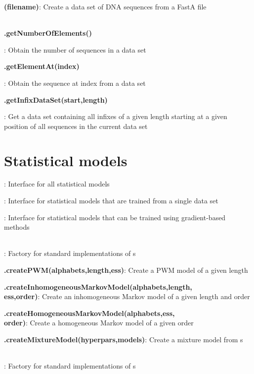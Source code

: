 \documentclass[10pt]{scrartcl}
\newcommand{\entry}[3]{{\item[]\bfseries #1#2}: #3}
\newcommand{\entrys}[3]{\item[\emph{static}] {\bfseries {#1#2}}: #3}
\newcommand{\entryn}[3]{\item[new] {\bfseries {#1#2}}: #3}
\newcommand{\sep}{\\~\vspace{-0.1cm}}
\begin{document}
\begin{flushleft}
\begin{itemize*}
\entryn{\DNADataSet}{(filename)}{Create a data set of DNA sequences from a FastA file}\sep

\entry{\DataSet}{.getNumberOfElements()}{Obtain the number of sequences in a data set}

\entry{\DataSet}{.getElementAt(index)}{Obtain the sequence at index from a data set}

\entry{\DataSet}{.getInfixDataSet(start,length)}{Get a data set containing all infixes of a given length starting at a given position of all sequences in the current data set}
\end{itemize*}

\section{Statistical models}

\begin{itemize*}

\entry{\StatMod}{}{Interface for all statistical models}

\entry{\TrainSM}{}{Interface for statistical models that are trained from a single data set}


\entry{\DiffSM}{}{Interface for statistical models that can be trained using gradient-based methods}\sep


\entry{\TrainSMFactory}{}{Factory for standard implementations of \TrainSM s}

\entrys{\TrainSMFactory}{.createPWM(alphabets,length,ess)}{Create a PWM model of a given length}

\entrys{\TrainSMFactory}{.createInhomogeneousMarkovModel(alphabets,length,\\ess,order)}{Create an inhomogeneous Markov model of a given length and order}

\entrys{\TrainSMFactory}{.createHomogeneousMarkovModel(alphabets,ess,\\order)}{Create a homogeneous Markov model of a given order}

\entrys{\TrainSMFactory}{.createMixtureModel(hyperpars,models)}{Create a mixture model from \TrainSM s}\sep

\entry{\DiffSMFactory}{}{Factory for standard implementations of \DiffSM s}


\end{itemize*}
\end{flushleft}
\end{document}
